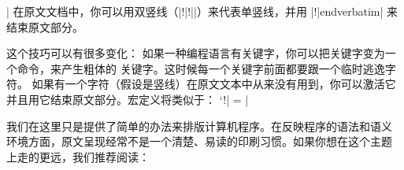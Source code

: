\def\!|{!|}
|
在原文文档中，你可以用双竖线（|!|!||）来代表单竖线，并用
|!|endverbatim| 来结束原文部分。

这个技巧可以有很多变化：
\ulist
\li 如果一种编程语言有关键字，你可以把关键字变为一个命令，来产生粗体的
关键字。这时候每一个关键字前面都要跟一个临时逃逸字符。
\li 如果有一个字符（假设是竖线）在原文文本中从来没有用到，你可以激活它
并且用它结束原文部分。宏定义将类似于：
\csdisplay
{\catcode `\!| = \active
\gdef\verbatim{%
   \par\begingroup\deactivate\obeywhitespace
   \catcode `!| = \active
   \def !|{\endgroup\par}%
}}
|
\endulist



我们在这里只是提供了简单的办法来排版计算机程序。在反映程序的语法和语义
环境方面，原文呈现经常不是一个清楚、易读的印刷习惯。如果你想在这个主题
上走的更远，我们推荐阅读：



